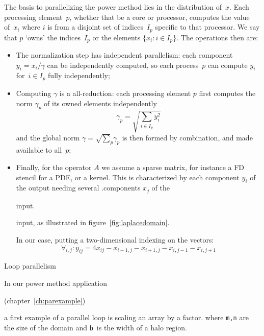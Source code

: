 The basis to parallelizing the power method lies in the distribution of~$x$.
Each processing element~$p$, whether that be a core or processor,
computes the value of~$x_i$ where $i$ is from a disjoint set of indices~$I_p$
specific to that processor.
We say that $p$ `owns' the indices~$I_p$ or the elements $\{x_i\colon i\in I_p\}$.
The operations then are:
\begin{itemize}
\item The normalization step has independent parallelism:
  each component $y_i=x_i/\gamma$ can be independently computed,
  so each process~$p$ can compute $y_i$ for~$i\in I_p$ fully independently;
\item Computing $\gamma$ is a all-reduction:
  each processing element $p$ first computes the norm $\gamma_p$
  of its owned elements independently
  \[ \gamma_p=\sqrt{ \sum_{i\in I_p}y_i^2 } \]
  and the global norm $\gamma=\surd\sum_p\gamma_p$ is then formed by combination, and
  made available to all~$p$;
\item Finally, for the operator $A$ we assume a sparse matrix,
  for instance a \acf{FD} stencil for a \ac{PDE}, or a  kernel.
  This is characterized by each component $y_i$ of the output needing several
  .components $x_j$ of the
\begin{nopackt}
    input.
\end{nopackt}
\begin{packt}
  input, as illustrated in figure~\ref{fig:laplacedomain}.
\end{packt}
In our case, putting a two-dimensional
  indexing on the vectors:
  \[ \forall_{i,j}\colon
  y_{ij} = 4x_{ij} - x_{i-1,j} -x_{i+1,j} - x_{i,j-1} - x_{i,j+1} \]
\end{itemize}


 {Loop parallelism}
\label{sec:d2d-omp1d}

In our power method application
\begin{packt}
  (chapter~\ref{ch:parexample})
\end{packt}
a first example of a parallel loop is scaling an array by a factor.
%
%
where \lstinline{m,n} are the size of the domain and \lstinline{b}~is the
width of a halo region.

